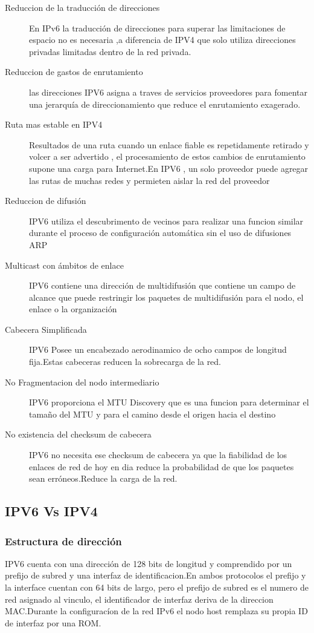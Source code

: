 \documentclass[11pt,a4paper]{article}
\begin{document}
\begin{description}
\item[Reduccion de la traducción de direcciones] En IPv6 la traducción de direcciones para superar las limitaciones de espacio no es necesaria ,a diferencia de IPV4 que solo utiliza direcciones privadas limitadas dentro de la red privada.
\item[Reduccion de gastos de enrutamiento] las direcciones IPV6 asigna a traves de servicios proveedores para fomentar una jerarquía de direccionamiento que reduce el enrutamiento exagerado.
\item[Ruta mas estable en IPV4]Resultados de una ruta cuando un enlace fiable es repetidamente retirado y volcer a ser advertido , el procesamiento de estos cambios de enrutamiento supone una carga para Internet.En IPV6 , un solo proveedor puede agregar las rutas de muchas redes y permieten aislar la red del proveedor
\item[Reduccion de difusión] IPV6  utiliza el descubrimento de vecinos para realizar una funcion similar durante el proceso de configuración automática sin el uso de difusiones ARP
\item[Multicast con ámbitos de enlace] IPV6 contiene una dirección de multidifusión que contiene un campo de alcance que puede restringir los paquetes de multidifusión para el nodo, el enlace o la organización
\item [Cabecera Simplificada] IPV6 Posee un encabezado aerodinamico de ocho campos de longitud fija.Estas cabeceras reducen la sobrecarga de la red.
\item[No Fragmentacion del nodo intermediario]IPV6 proporciona el MTU Discovery que es una funcion para determinar el tamaño del MTU y para el camino desde el origen hacia el destino
\item[No existencia del checksum de cabecera]IPV6 no necesita ese checksum de cabecera ya que la fiabilidad de los enlaces de red de hoy en dia reduce la probabilidad de que los paquetes sean erróneos.Reduce la carga de la red.
\end{description}
\subsection{IPV6 Vs IPV4}
\subsubsection{Estructura de dirección}
IPV6 cuenta con una dirección de 128 bits de longitud y comprendido por un prefijo de subred y una interfaz de identificacion.En ambos protocolos el prefijo y la interface cuentan con 64 bits de largo, pero el prefijo de subred es el numero de red asignado al vinculo, el identificador de interfaz deriva de la direccion MAC.Durante la configuracíon de la red IPv6 el nodo host remplaza su propia ID de interfaz por una ROM.
\end{document}
